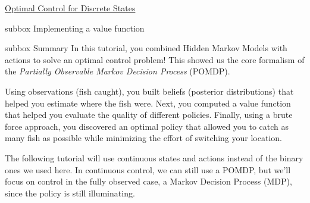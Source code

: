 \begin{textbox}{\href{https://compneuro.neuromatch.io/tutorials/W3D3_OptimalControl/student/W3D3_Tutorial1.html}{Optimal Control for Discrete States }   }
\begin{subbox}{subbox}{ Implementing a value function}
\end{subbox}

\begin{subbox}{subbox}{ Summary}
\scriptsize
In this tutorial, you combined Hidden Markov Models with actions to solve an optimal control problem! This showed us the core formalism of the \textit{Partially Observable Markov Decision Process} (POMDP).

Using observations (fish caught), you built beliefs (posterior distributions) that helped you estimate where the fish were. Next, you computed a value function that helped you evaluate the quality of different policies. Finally, using a brute force approach, you discovered an optimal policy that allowed you to catch as many fish as possible while minimizing the effort of switching your location.

The following tutorial will use continuous states and actions instead of the binary ones we used here. In continuous control, we can still use a POMDP, but we'll focus on control in the fully observed case, a Markov Decision Process (MDP), since the policy is still illuminating.

\end{subbox}
\end{textbox}
